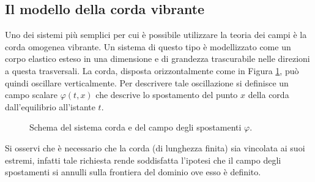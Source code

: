 \subsection{Il modello della corda vibrante}
Uno dei sistemi più semplici per cui è possibile utilizzare la teoria dei campi è la corda omogenea vibrante. Un sistema di questo tipo è modellizzato come un corpo elastico esteso in una dimensione e di grandezza trascurabile nelle direzioni a questa trasversali. La corda, disposta orizzontalmente come in Figura \ref{fig:corda}, può quindi oscillare verticalmente. Per descrivere tale oscillazione si definisce un campo scalare $\varphi(t,x)$ che descrive lo spostamento del punto $x$ della corda dall'equilibrio all'istante $t$.
\begin{figure}[H]
    \centering
    \caption{Schema del sistema corda e del campo degli spostamenti $\varphi$.}
    \label{fig:corda}
\end{figure} 
Si osservi che è necessario che la corda (di lunghezza finita) sia vincolata ai suoi estremi, infatti tale richiesta rende soddisfatta l'ipotesi che il campo degli spostamenti si annulli sulla frontiera del dominio ove esso è definito. \\


